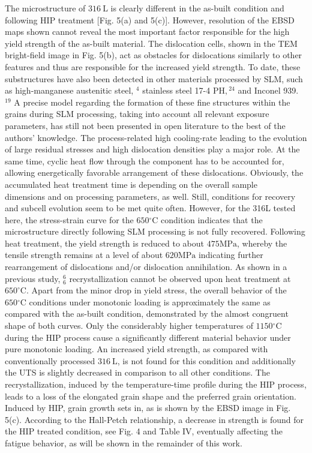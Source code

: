 \documentclass[10pt]{article}
\begin{document}
The microstructure of $316 \mathrm{~L}$ is clearly different in the as-built condition and following HIP treatment [Fig. 5(a) and 5(c)]. However, resolution of the EBSD maps shown cannot reveal the most important factor responsible for the high yield strength of the as-built material. The dislocation cells, shown in the TEM bright-field image in Fig. 5(b), act as obstacles for dislocations similarly to other features and thus are responsible for the increased yield strength. To date, these substructures have also been detected in other materials processed by SLM, such as high-manganese austenitic steel, ${ }^{4}$ stainless steel 17-4 $\mathrm{PH},{ }^{24}$ and Inconel 939. ${ }^{19}$ A precise model regarding the formation of these fine structures within the grains during SLM processing, taking into account all relevant exposure parameters, has still not been presented in open literature to the best of the authors' knowledge. The process-related high cooling-rate leading to the evolution of large residual stresses and high dislocation densities play a major role. At the same time, cyclic heat flow through the component has to be accounted for, allowing energetically favorable arrangement of these dislocations. Obviously, the accumulated heat treatment time is depending on the overall sample\\
dimensions and on processing parameters, as well. Still, conditions for recovery and subcell evolution seem to be met quite often. However, for the 316L tested here, the stress-strain curve for the $650{ }^{\circ} \mathrm{C}$ condition indicates that the microstructure directly following SLM processing is not fully recovered. Following heat treatment, the yield strength is reduced to about $475 \mathrm{MPa}$, whereby the tensile strength remains at a level of about $620 \mathrm{MPa}$ indicating further rearrangement of dislocations and/or dislocation annihilation. As shown in a previous study, ${ }_{6}^{6}$ recrystallization cannot be observed upon heat treatment at $650^{\circ} \mathrm{C}$. Apart from the minor drop in yield stress, the overall behavior of the $650{ }^{\circ} \mathrm{C}$ conditions under monotonic loading is approximately the same as compared with the as-built condition, demonstrated by the almost congruent shape of both curves. Only the considerably higher temperatures of $1150{ }^{\circ} \mathrm{C}$ during the HIP process cause a significantly different material behavior under pure monotonic loading. An increased yield strength, as compared with conventionally processed $316 \mathrm{~L}$, is not found for this condition and additionally the UTS is slightly decreased in comparison to all other conditions. The recrystallization, induced by the temperature-time profile during the HIP process, leads to a loss of the elongated grain shape and the preferred grain orientation. Induced by HIP, grain growth sets in, as is shown by the EBSD image in Fig. 5(c). According to the Hall-Petch relationship, a decrease in strength is found for the HIP treated condition, see Fig. 4 and Table IV, eventually affecting the fatigue behavior, as will be shown in the remainder of this work.
\end{document}
